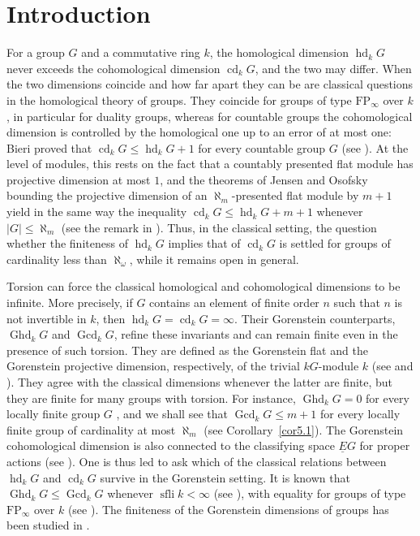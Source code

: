 \documentclass[12pt]{amsart}
\theoremstyle{remark}
\theoremstyle{definition}
\theoremstyle{plain}
\DeclareMathOperator{\Ghd}{Ghd}
\DeclareMathOperator{\Gcd}{Gcd}
\DeclareMathOperator{\cd}{cd}
\DeclareMathOperator{\hd}{hd}
\DeclareMathOperator{\sfli}{sfli}
\newcommand{\alephm}{\aleph_m}
\begin{document}
\section{Introduction}
For a group $G$ and a commutative ring $k$, the homological dimension $\hd_kG$ never exceeds the cohomological dimension $\cd_kG$, and the two may differ. When the two dimensions coincide and how far apart they can be are classical questions in the homological theory of groups. They coincide for groups of type $\mathrm{FP}_\infty$ over $k$, in particular for duality groups, whereas for countable groups the cohomological dimension is controlled by the homological one up to an error of at most one: Bieri proved that $\cd_kG\le\hd_kG+1$ for every countable group $G$ (see \cite[Theorem~4.6]{Bieri}). At the level of modules, this rests on the fact that a countably presented flat module has projective dimension at most $1$, and the theorems of Jensen and Osofsky bounding the projective dimension of an $\alephm$-presented flat module by $m+1$ \cite{Jen,Oso} yield in the same way the inequality $\cd_kG\le\hd_kG+m+1$ whenever $|G|\le\alephm$ (see the remark in \cite[p.~56]{Bieri}). Thus, in the classical setting, the question whether the finiteness of $\hd_kG$ implies that of $\cd_kG$ is settled for groups of cardinality less than $\aleph_\omega$, while it remains open in general.

Torsion can force the classical homological and cohomological dimensions to be infinite. More precisely, if $G$ contains an element of finite order $n$ such that $n$ is not invertible in $k$, then $\operatorname{hd}_k G=\operatorname{cd}_k G=\infty$. Their Gorenstein counterparts, $\Ghd_k G$ and $\Gcd_k G$, refine these invariants and can remain finite even in the presence of such torsion.
 They are defined as the Gorenstein flat and the Gorenstein projective dimension, respectively, of the trivial $kG$-module $k$ (see \cite{ABHS,KS,RY} and \cite{BDT,ET}). They agree with the classical dimensions whenever the latter are finite, but they are finite for many groups with torsion. For instance, $\Ghd_kG=0$ for every locally finite group $G$ \cite[Theorem~1.4]{KS}, and we shall see that $\Gcd_kG\le m+1$ for every locally finite group of cardinality at most $\alephm$ (see Corollary~\ref{cor5.1}). The Gorenstein cohomological dimension is also connected to the classifying space $\underline{E}G$ for proper actions (see \cite{BDT}). One is thus led to ask which of the classical relations between $\hd_kG$ and $\cd_kG$ survive in the Gorenstein setting. It is known that $\Ghd_kG\le\Gcd_kG$ whenever $\sfli k<\infty$ (see \cite[Theorem~3.10]{KS}), with equality for groups of type $\mathrm{FP}_\infty$ over $k$ (see \cite[Theorem~B]{St}). The finiteness of the Gorenstein dimensions of groups has been studied in \cite{ET,KS}.
\end{document}
